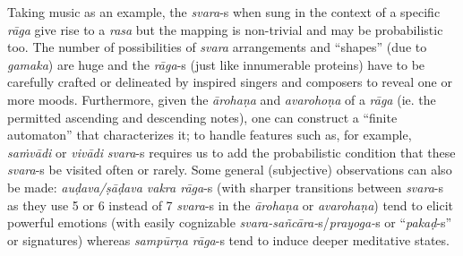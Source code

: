 Taking music as an example, the \textsl{svara}-s when sung in the context of a specific \textsl{rāga} give rise to a \textsl{rasa} but the mapping is non-trivial and may be probabilistic too. The number of possibilities of \textsl{svara} arrangements and “shapes” (due to \textsl{gamaka}) are huge and the \textsl{rāga}-s (just like innumerable proteins) have to be carefully crafted or delineated by inspired singers and composers to reveal one or more moods. Furthermore, given the \textsl{ārohaṇa} and \textsl{avarohoṇa} of a \textsl{rāga} (ie. the permitted ascending and descending notes), one can construct a “finite automaton” that characterizes it; to handle features such as, for example, \textsl{saṁvādi} or \textsl{vivādi} \textsl{svara}-s requires us to add the probabilistic condition that these \textsl{svara}-s be visited often or rarely. Some general (subjective) observations can also be made: \textsl{auḍava/ṣāḍava vakra rāga}-s (with sharper transitions between \textsl{svara}-s as they use 5 or 6 instead of 7 \textsl{svara}-s in the \textsl{ārohaṇa} or \textsl{avarohaṇa}) tend to elicit powerful emotions (with easily cognizable \textsl{svara-sañcāra-}s/\textsl{prayoga-}s or “\textsl{pakaḍ}-s” or signatures) whereas \textsl{sampūrṇa rāga}-s tend to induce deeper meditative states.

